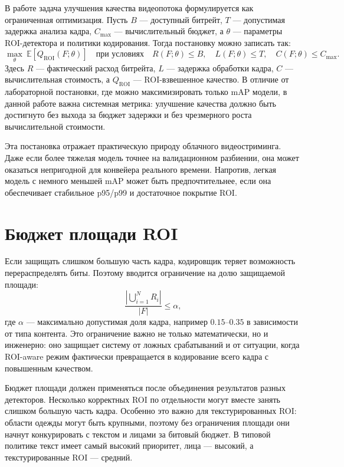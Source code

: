 \documentclass[12pt,a4paper,oneside,openany]{report}
\newcommand{\roi}{\mathrm{ROI}}
\begin{document}
В работе задача улучшения качества видеопотока формулируется как ограниченная оптимизация. Пусть
$B$ --- доступный битрейт, $T$ --- допустимая задержка анализа кадра, $C_{\max}$ ---
вычислительный бюджет, а $\theta$ --- параметры ROI-детектора и политики кодирования. Тогда
постановку можно записать так:
\begin{equation}
  \max_{\theta}\ \mathbb{E}\left[ Q_{\roi}(F;\theta) \right]\quad\text{при условиях}\quad
  R(F;\theta) \leq B,\quad L(F;\theta) \leq T,\quad C(F;\theta) \leq C_{\max}.
  \label{eq:constrained_opt}
\end{equation}
Здесь $R$ --- фактический расход битрейта, $L$ --- задержка обработки кадра, $C$ ---
вычислительная стоимость, а $Q_{\roi}$ --- ROI-взвешенное качество. В отличие от лабораторной
постановки, где можно максимизировать только mAP модели, в данной работе важна системная
метрика: улучшение качества должно быть достигнуто без выхода за бюджет задержки и без
чрезмерного роста вычислительной стоимости.

Эта постановка отражает практическую природу облачного видеостриминга. Даже если более тяжелая
модель точнее на валидационном разбиении, она может оказаться непригодной для конвейера
реального времени. Напротив, легкая модель с немного меньшей mAP может быть предпочтительнее,
если она обеспечивает стабильное p95/p99 и достаточное покрытие ROI.


\section{Бюджет площади ROI}

Если защищать слишком большую часть кадра, кодировщик теряет возможность перераспределять биты.
Поэтому вводится ограничение на долю защищаемой площади:
\begin{equation}
  \frac{\left|\bigcup_{i=1}^{N} R_i\right|}{|F|} \leq \alpha,
  \label{eq:area_budget}
\end{equation}
где $\alpha$ --- максимально допустимая доля кадра, например $0.15$--$0.35$ в зависимости от
типа контента. Это ограничение важно не только математически, но и инженерно: оно защищает
систему от ложных срабатываний и от ситуации, когда ROI-aware режим фактически превращается в
кодирование всего кадра с повышенным качеством.

Бюджет площади должен применяться после объединения результатов разных детекторов. Несколько
корректных ROI по отдельности могут вместе занять слишком большую часть кадра. Особенно это
важно для текстурированных ROI: области одежды могут быть крупными, поэтому без ограничения
площади они начнут конкурировать с текстом и лицами за битовый бюджет. В типовой политике текст
имеет самый высокий приоритет, лица --- высокий, а текстурированные ROI --- средний.
\end{document}
